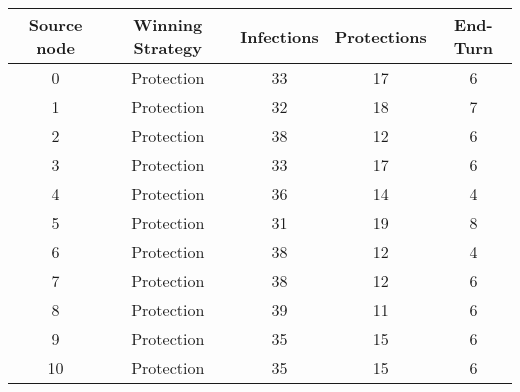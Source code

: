 \documentclass[results.tex]{subfiles}
\begin{document}
    \begin{center}
        \begin{tabular}{| c || c | c | c | c |}
            \hline
            {\bfseries Source node} & {\bfseries Winning Strategy} & {\bfseries Infections} & {\bfseries Protections}
            & {\bfseries End-Turn}
            \\  %
            \hline\hline
            0                       & Protection                   & 33                     & 17                      & 6                    \\
            \hline
            1                       & Protection                   & 32                     & 18                      & 7                    \\
            \hline
            2                       & Protection                   & 38                     & 12                      & 6                    \\
            \hline
            3                       & Protection                   & 33                     & 17                      & 6                    \\
            \hline
            4                       & Protection                   & 36                     & 14                      & 4                    \\
            \hline
            5                       & Protection                   & 31                     & 19                      & 8                    \\
            \hline
            6                       & Protection                   & 38                     & 12                      & 4                    \\
            \hline
            7                       & Protection                   & 38                     & 12                      & 6                    \\
            \hline
            8                       & Protection                   & 39                     & 11                      & 6                    \\
            \hline
            9                       & Protection                   & 35                     & 15                      & 6                    \\
            \hline
            10                      & Protection                   & 35                     & 15                      & 6                    \\

\end{tabular}
\end{center}
\end{document}
